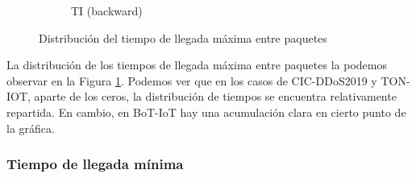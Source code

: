 \begin{figure}[H]
\begin{subfigure}[b]{0.26\textwidth}
        \caption{TI (backward)}
    \end{subfigure}
    \hfill
       \caption{Distribución del tiempo de llegada máxima entre paquetes}
       \label{fig:packet_pincer_inter_arrival_time_max}
\end{figure}

La distribución de los tiempos de llegada máxima entre paquetes la podemos observar en la Figura \ref{fig:packet_pincer_inter_arrival_time_max}. Podemos ver que en los casos de CIC-DDoS2019 y TON-IOT, aparte de los ceros, la distribución de tiempos se encuentra relativamente repartida. En cambio, en BoT-IoT hay una acumulación clara en cierto punto de la gráfica.

\subsubsection{Tiempo de llegada mínima}

